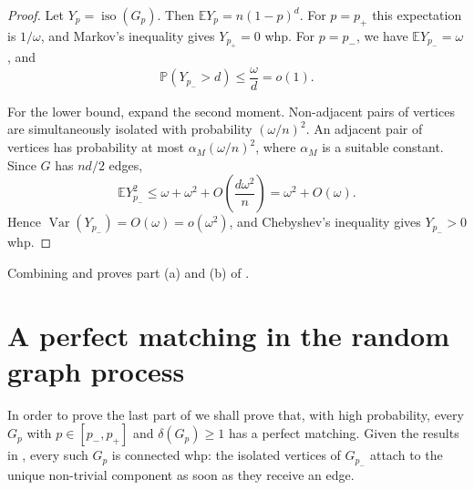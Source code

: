 \documentclass[notitlepage]{scrartcl}
\newcommand{\whp}{whp}
\newcommand{\iso}{\operatorname{iso}}
\begin{document}
\begin{proof}
Let $Y_p=\iso(G_p)$.
Then $\mathbb{E}Y_p=n(1-p)^d$.
For $p=p_+$ this expectation is $1/\omega$, and Markov's inequality gives $Y_{p_+}=0$ \whp.
For $p=p_-$, we have $\mathbb{E}Y_{p_-}=\omega$, and
\[
  \mathbb{P}(Y_{p_-}>d)\le\frac{\omega}{d}=o(1).
\]

For the lower bound, expand the second moment.
Non-adjacent pairs of vertices are simultaneously isolated with probability $(\omega/n)^2$. An adjacent pair of vertices has probability at most $\alpha_M(\omega/n)^2$, where $\alpha_M$ is a suitable constant.
Since $G$ has $nd/2$ edges,
\[
  \mathbb{E}Y_{p_-}^2
  \le \omega+\omega^2+O\left(\frac{d\omega^2}{n}\right)
  =\omega^2+O(\omega).
\]
Hence $\operatorname{Var}(Y_{p_-})=O(\omega)=o(\omega^2)$, and Chebyshev's inequality gives $Y_{p_-}>0$ \whp.
\end{proof}

Combining  and  proves part (a) and (b) of .



\section{A perfect matching in the random graph process}\label{s:matching}

In order to prove the last part of  we shall prove that, with high probability, every
$G_p$ with $p\in[p_-,p_+]$ and $\delta(G_p)\ge1$ has a perfect matching.
Given the results in , every such $G_p$ is connected whp:
the isolated vertices of $G_{p_-}$ attach to the unique non-trivial component as soon as they receive an edge.
\end{document}
